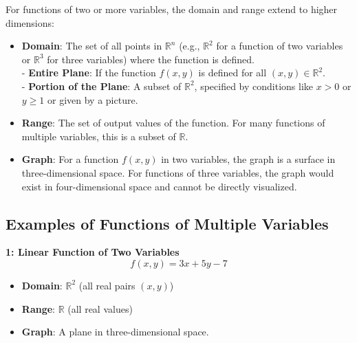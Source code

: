 For functions of two or more variables, the domain and range extend to higher dimensions:
\begin{itemize}
    \item \textbf{Domain}: The set of all points in \(\mathbb{R}^n\) (e.g., \(\mathbb{R}^2\) for a function of two variables or \(\mathbb{R}^3\) for three variables) where the function is defined.\\
        - \textbf{Entire Plane}: If the function \( f(x, y) \) is defined for all \((x, y) \in \mathbb{R}^2\).\\
        - \textbf{Portion of the Plane}: A subset of \(\mathbb{R}^2\), specified by conditions like \(x > 0\) or \(y \geq 1\) or given by a picture.
    \item \textbf{Range}: The set of output values of the function. For many functions of multiple variables, this is a subset of \(\mathbb{R}\).
    \item \textbf{Graph}: For a function \( f(x, y) \) in two variables, the graph is a surface in three-dimensional space. For functions of three variables, the graph would exist in four-dimensional space and cannot be directly visualized.
\end{itemize}

\subsection*{Examples of Functions of Multiple Variables}

\textbf{1: Linear Function of Two Variables}
    \[
    f(x, y) = 3x + 5y - 7
    \]
    \begin{itemize}
        \item \textbf{Domain}: \(\mathbb{R}^2\) (all real pairs \((x, y)\))
        \item \textbf{Range}: \(\mathbb{R}\) (all real values)
        \item \textbf{Graph}: A plane in three-dimensional space.
    \end{itemize}

